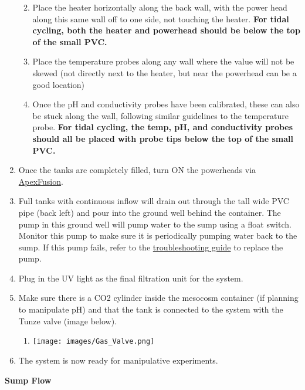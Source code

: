\documentclass[
]{book}
\providecommand{\tightlist}{%
  \setlength{\itemsep}{0pt}\setlength{\parskip}{0pt}}
\begin{document}
\begin{enumerate}
  \begin{enumerate}
  \def\labelenumii{\arabic{enumii}.}
  \tightlist
  \item
    Place the heater horizontally along the back wall, with the power head along this same wall off to one side, not touching the heater. \textbf{For tidal cycling, both the heater and powerhead should be below the top of the small PVC.}
  \item
    Place the temperature probes along any wall where the value will not be skewed (not directly next to the heater, but near the powerhead can be a good location)
  \item
    Once the pH and conductivity probes have been calibrated, these can also be stuck along the wall, following similar guidelines to the temperature probe. \textbf{For tidal cycling, the temp, pH, and conductivity probes should all be placed with probe tips below the top of the small PVC.}
  \end{enumerate}
\item
  Once the tanks are completely filled, turn ON the powerheads via \href{apexfusion.com}{ApexFusion}.
\item
  Full tanks with continuous inflow will drain out through the tall wide PVC pipe (back left) and pour into the ground well behind the container. The pump in this ground well will pump water to the sump using a float switch. Monitor this pump to make sure it is periodically pumping water back to the sump. If this pump fails, refer to the \href{14-troubleshooting_guide.rmd}{troubleshooting guide} to replace the pump.
\item
  Plug in the UV light as the final filtration unit for the system.
\item
  Make sure there is a CO2 cylinder inside the mesocosm container (if planning to manipulate pH) and that the tank is connected to the system with the Tunze valve (image below).

  \begin{enumerate}
  \def\labelenumii{\arabic{enumii}.}
  \tightlist
  \item
    \texttt{[image: images/Gas\_Valve.png]}
  \end{enumerate}
\item
  The system is now ready for manipulative experiments.
\end{enumerate}

\textbf{Sump Flow}
\end{document}
